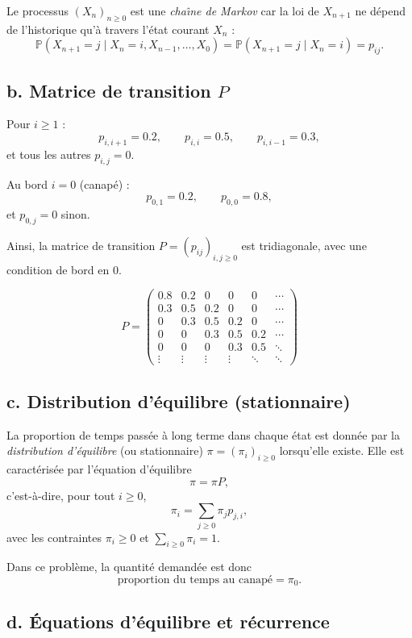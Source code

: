 Le processus $(X_n)_{n\ge 0}$ est une \emph{cha\^{\i}ne de Markov} car la loi de $X_{n+1}$ ne d\'epend de l'historique qu'\`a travers l'\'etat courant $X_n$ :
\[
\mathbb{P}(X_{n+1}=j\mid X_n=i, X_{n-1},\dots,X_0)=\mathbb{P}(X_{n+1}=j\mid X_n=i)=p_{ij}.
\]

\subsection*{b. Matrice de transition $P$}

Pour $i\ge 1$ :
\[
p_{i,i+1}=0.2,\qquad p_{i,i}=0.5,\qquad p_{i,i-1}=0.3,
\]
et tous les autres $p_{i,j}=0$.

Au bord $i=0$ (canap\'e) :
\[
p_{0,1}=0.2,\qquad p_{0,0}=0.8,
\]
et $p_{0,j}=0$ sinon.

Ainsi, la matrice de transition $P=(p_{ij})_{i,j\ge 0}$ est tridiagonale, avec une condition de bord en $0$.


\[
P =
\begin{pmatrix}
0.8 & 0.2 & 0   & 0   & 0   & \cdots \\
0.3 & 0.5 & 0.2 & 0   & 0   & \cdots \\
0   & 0.3 & 0.5 & 0.2 & 0   & \cdots \\
0   & 0   & 0.3 & 0.5 & 0.2 & \cdots \\
0   & 0   & 0   & 0.3 & 0.5 & \ddots \\
\vdots & \vdots & \vdots & \vdots & \ddots & \ddots
\end{pmatrix}
\]

\subsection*{c. Distribution d'\'equilibre (stationnaire)}

La proportion de temps pass\'ee \`a long terme dans chaque \'etat est donn\'ee par la \emph{distribution d'\'equilibre} (ou stationnaire) $\pi=(\pi_i)_{i\ge 0}$ lorsqu'elle existe.
Elle est caract\'eris\'ee par l'\'equation d'\'equilibre
\[
\pi = \pi P,
\]
c'est-\`a-dire, pour tout $i\ge 0$,
\[
\pi_i=\sum_{j\ge 0}\pi_j p_{j,i},
\]
avec les contraintes $\pi_i\ge 0$ et $\sum_{i\ge 0}\pi_i=1$.

Dans ce probl\`eme, la quantit\'e demand\'ee est donc
\[
\text{proportion du temps au canap\'e}=\pi_0.
\]

\subsection*{d. \'Equations d'\'equilibre et r\'ecurrence}

